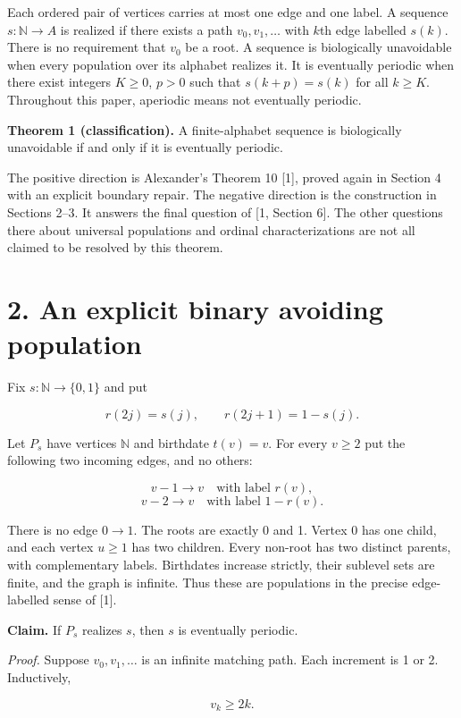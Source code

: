 \documentclass[
  11pt,
]{article}
\begin{document}
Each ordered pair of vertices carries at most one edge and one label. A
sequence \(s:\mathbb N\to A\) is realized if there exists a path
\(v_0,v_1,\ldots\) with \(k\)th edge labelled \(s(k)\). There is no
requirement that \(v_0\) be a root. A sequence is biologically
unavoidable when every population over its alphabet realizes it. It is
eventually periodic when there exist integers \(K\ge0\), \(p>0\) such
that \(s(k+p)=s(k)\) for all \(k\ge K\). Throughout this paper,
aperiodic means not eventually periodic.

\textbf{Theorem 1 (classification).} A finite-alphabet sequence is
biologically unavoidable if and only if it is eventually periodic.

The positive direction is Alexander's Theorem 10 {[}1{]}, proved again
in Section 4 with an explicit boundary repair. The negative direction is
the construction in Sections 2--3. It answers the final question of
{[}1, Section 6{]}. The other questions there about universal
populations and ordinal characterizations are not all claimed to be
resolved by this theorem.

\section{2. An explicit binary avoiding
population}\label{an-explicit-binary-avoiding-population}

Fix \(s:\mathbb N\to\{0,1\}\) and put

\[r(2j)=s(j),\qquad r(2j+1)=1-s(j).\]

Let \(P_s\) have vertices \(\mathbb N\) and birthdate \(t(v)=v\). For
every \(v\ge2\) put the following two incoming edges, and no others:

\[v-1\longrightarrow v\quad\text{with label }r(v),\]
\[v-2\longrightarrow v\quad\text{with label }1-r(v).\]

There is no edge \(0\to1\). The roots are exactly 0 and 1. Vertex 0 has
one child, and each vertex \(u\ge1\) has two children. Every non-root
has two distinct parents, with complementary labels. Birthdates increase
strictly, their sublevel sets are finite, and the graph is infinite.
Thus these are populations in the precise edge-labelled sense of
{[}1{]}.

\textbf{Claim.} If \(P_s\) realizes \(s\), then \(s\) is eventually
periodic.

\emph{Proof.} Suppose \(v_0,v_1,\ldots\) is an infinite matching path.
Each increment is 1 or 2. Inductively,

\[v_k\ge 2k.\]
\end{document}
